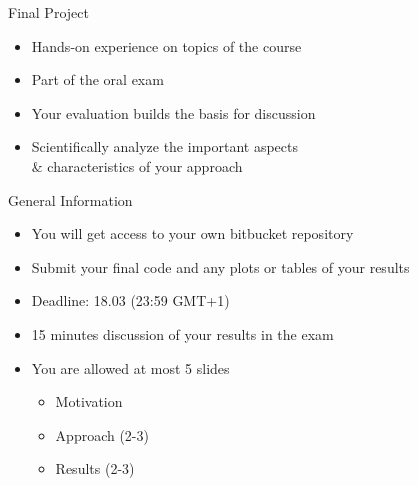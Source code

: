 \begin{frame}[c]{Final Project}
    \begin{itemize}
        \item Hands-on experience on topics of the course
        \item Part of the oral exam
        \item Your evaluation builds the basis for discussion
        \item \alert{Scientifically analyze the important aspects\\ \& characteristics of your approach}
    \end{itemize}
\end{frame}
\begin{frame}[c]{General Information}
\begin{itemize}
    \item You will get access to your own bitbucket repository
    \item Submit your final code and any plots or tables of your results
    \item Deadline: 18.03 (23:59 GMT+1)
    \item 15 minutes discussion of your results in the exam
    \item You are allowed at most 5 slides
        \begin{itemize}
            \item Motivation
            \item Approach (2-3)
            \item Results (2-3)
        \end{itemize}
\end{itemize}
\end{frame}
